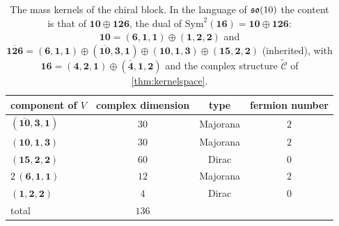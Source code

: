 \begin{table}[ht]
\centering\small
\begin{tabular}{@{}lccc@{}}
\toprule
component of $V$ & complex dimension & type & fermion number\\
\midrule
$(\bar{\mathbf{10}},\mathbf3,\mathbf1)$ & $30$ & Majorana & $2$\\
$(\mathbf{10},\mathbf1,\mathbf3)$ & $30$ & Majorana & $2$\\
$(\mathbf{15},\mathbf2,\mathbf2)$ & $60$ & Dirac & $0$\\
$2\,(\mathbf6,\mathbf1,\mathbf1)$ & $12$ & Majorana & $2$\\
$(\mathbf1,\mathbf2,\mathbf2)$ & $4$ & Dirac & $0$\\
\midrule
total & $136$ & & \\
\bottomrule
\end{tabular}
\caption{The mass kernels of the chiral block. In the language of $\mathfrak{so}(10)$ the content is that of $\mathbf{10}\oplus\overline{\mathbf{126}}$, the dual of
$\mathrm{Sym}^2(\mathbf{16})=\mathbf{10}\oplus\mathbf{126}$: $\mathbf{10}=(\mathbf6,\mathbf1,\mathbf1)\oplus(\mathbf1,\mathbf2,\mathbf2)$ and
$\overline{\mathbf{126}}=(\mathbf6,\mathbf1,\mathbf1)\oplus(\overline{\mathbf{10}},\mathbf3,\mathbf1)\oplus(\mathbf{10},\mathbf1,\mathbf3)\oplus(\mathbf{15},\mathbf2,\mathbf2)$
(inherited), with $\mathbf{16}=(\mathbf4,\mathbf2,\mathbf1)\oplus(\bar{\mathbf4},\mathbf1,\mathbf2)$ and the complex structure $\widetilde{\mathcal C}$ of \cref{thm:kernelspace}.}
\label{tab:app:kernels}
\end{table}
